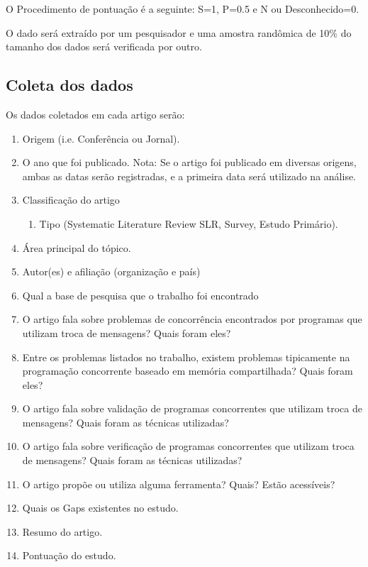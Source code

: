 O Procedimento de pontuação é a seguinte: S=1, P=0.5 e N ou Desconhecido=0.

O dado será extraído por um pesquisador e uma amostra randômica de 10\% do tamanho dos dados será verificada por outro. 

\subsection{Coleta dos dados}

Os dados coletados em cada artigo serão:

\begin{enumerate}
    \item Origem (i.e. Conferência ou Jornal). 
    \item O ano que foi publicado. Nota: Se o artigo foi publicado em diversas origens, ambas as datas serão registradas, e a primeira data será utilizado na análise. 
    \item Classificação do artigo 
    \begin{enumerate}
        \item Tipo (Systematic Literature Review SLR, Survey, Estudo Primário). 
    \end{enumerate}
    \item Área principal do tópico. 
    \item Autor(es) e afiliação (organização e país) 
    \item Qual a base de pesquisa que o trabalho foi encontrado
    \item O artigo fala sobre problemas de concorrência encontrados por programas que utilizam troca de mensagens? Quais foram eles?
    \item Entre os problemas listados no trabalho, existem problemas tipicamente na programação concorrente baseado em memória compartilhada? Quais foram eles?
    \item O artigo fala sobre validação de programas concorrentes que utilizam troca de mensagens? Quais foram as técnicas utilizadas?
    \item O artigo fala sobre verificação de programas concorrentes que utilizam troca de mensagens? Quais foram as técnicas utilizadas?
    \item O artigo propõe ou utiliza alguma ferramenta? Quais? Estão acessíveis?    
    \item Quais os Gaps existentes no estudo.
    \item Resumo do artigo. 
    \item Pontuação do estudo. 
\end{enumerate}

